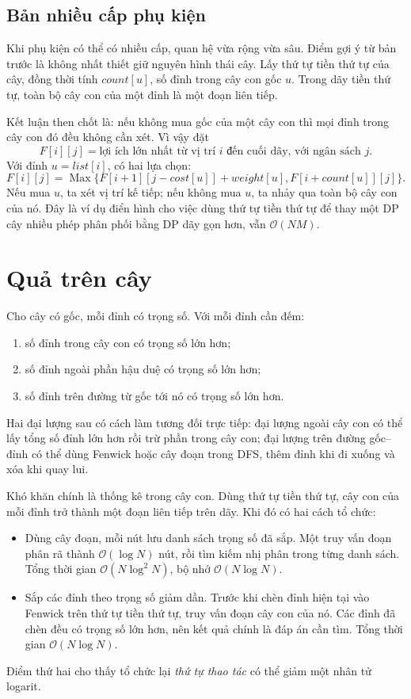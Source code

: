\documentclass[11pt]{article}
\newcommand{\Oh}{\mathcal{O}}
\newcommand{\Max}{\operatorname{Max}}
\begin{document}
\subsection{Bản nhiều cấp phụ kiện}

Khi phụ kiện có thể có nhiều cấp, quan hệ vừa rộng vừa sâu. Điểm gợi ý từ
bản trước là không nhất thiết giữ nguyên hình thái cây. Lấy thứ tự tiền thứ
tự của cây, đồng thời tính \(\mathit{count}[u]\), số đỉnh trong cây con gốc
\(u\). Trong dãy tiền thứ tự, toàn bộ cây con của một đỉnh là một đoạn liên
tiếp.

Kết luận then chốt là: nếu không mua gốc của một cây con thì mọi đỉnh trong
cây con đó đều không cần xét. Vì vậy đặt
\[
  F[i][j]=\text{lợi ích lớn nhất từ vị trí }i\text{ đến cuối dãy,
  với ngân sách }j.
\]
Với đỉnh \(u=\mathit{list}[i]\), có hai lựa chọn:
\[
  F[i][j]=
  \Max\{
    F[i+1][j-\mathit{cost}[u]]+\mathit{weight}[u],
    F[i+\mathit{count}[u]][j]
  \}.
\]
Nếu mua \(u\), ta xét vị trí kế tiếp; nếu không mua \(u\), ta nhảy qua toàn
bộ cây con của nó. Đây là ví dụ điển hình cho việc dùng thứ tự tiền thứ tự để
thay một DP cây nhiều phép phân phối bằng DP dãy gọn hơn, vẫn \(\Oh(NM)\).

\section{Quả trên cây}

Cho cây có gốc, mỗi đỉnh có trọng số. Với mỗi đỉnh cần đếm:
\begin{enumerate}
  \item số đỉnh trong cây con có trọng số lớn hơn;
  \item số đỉnh ngoài phần hậu duệ có trọng số lớn hơn;
  \item số đỉnh trên đường từ gốc tới nó có trọng số lớn hơn.
\end{enumerate}

Hai đại lượng sau có cách làm tương đối trực tiếp: đại lượng ngoài cây con có
thể lấy tổng số đỉnh lớn hơn rồi trừ phần trong cây con; đại lượng trên đường
gốc--đỉnh có thể dùng Fenwick hoặc cây đoạn trong DFS, thêm đỉnh khi đi xuống
và xóa khi quay lui.

Khó khăn chính là thống kê trong cây con. Dùng thứ tự tiền thứ tự, cây con
của mỗi đỉnh trở thành một đoạn liên tiếp trên dãy. Khi đó có hai cách tổ
chức:
\begin{itemize}
  \item Dùng cây đoạn, mỗi nút lưu danh sách trọng số đã sắp. Một truy vấn
  đoạn phân rã thành \(\Oh(\log N)\) nút, rồi tìm kiếm nhị phân trong từng
  danh sách. Tổng thời gian \(\Oh(N\log^2 N)\), bộ nhớ \(\Oh(N\log N)\).
  \item Sắp các đỉnh theo trọng số giảm dần. Trước khi chèn đỉnh hiện tại vào
  Fenwick trên thứ tự tiền thứ tự, truy vấn đoạn cây con của nó. Các đỉnh đã
  chèn đều có trọng số lớn hơn, nên kết quả chính là đáp án cần tìm. Tổng
  thời gian \(\Oh(N\log N)\).
\end{itemize}
Điểm thứ hai cho thấy tổ chức lại \emph{thứ tự thao tác} có thể giảm một
nhân tử logarit.
\end{document}
